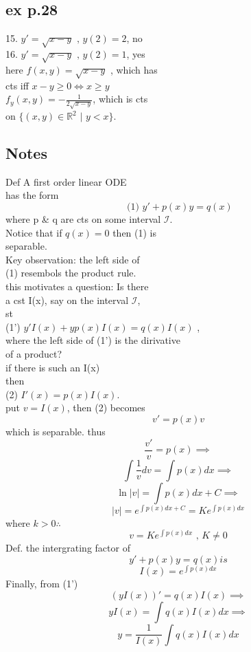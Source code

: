 \documentclass[10pt,a4paper]{article}
\begin{document}
  \newpage 
{}
  \subsection*{ ex p.28 }
  15. \( y' = \sqrt{x-y} \text{ ,  } y(2) = 2 \),  no \\
  16. \( y' = \sqrt{x-y} \text{ ,  } y(2) = 1 \),  yes \\
  here \( f(x, y) = \sqrt{x-y}\) , which has \\
  cts iff  \( x-y \geq 0 \iff x \geq y\) \\ 
  \( f_y(x, y) = - \frac{1}{2\sqrt{x-y}}\),  which is cts \\
  on \( \{ (x,y) \in \mathbb{R}^2 \text{ | } y<x \}\). \\
  \subsection*{ Notes \\ } 
  Def A first order linear ODE \\
  has the form
  \[ \text{ (1) } y' + p(x)y = q(x)\] 
  where p \& q are cts on some interval \( \mathcal{I}\). \\
  Notice that if \( q(x) = 0\) then (1) is \\	
  separable. \\	  
  Key observation: the left side of \\
  (1) resembols the product rule. \\
  this motivates a question: Is there \\
  a cst I(x), say on the interval \( \mathcal{I}\),  \\
  st  \\
  (1') \( y'I(x) + yp(x)I(x) = q(x)I(x)\) ,  \\
  where the left side of (1') is the dirivative  \\
  of a product? \\

  if there is such an I(x)  \\
  then  \\
  (2) \( I'(x) = p(x)I(x)\). \\
  put \( v = I(x)\), then (2) becomes  \\
  \[ v' = p(x)v\]
  which is separable. thus \nonumber\\
  \[ \frac{v'}{v} = p(x) \implies\]
  \[ \int \frac{1}{v}dv = \int p(x)dx \implies\]
  \[ \ln|v| = \int p(x)dx + C \implies \]
  \[ |v| = e^{\int p(x)dx + C} = Ke^{\int p(x)dx}\]
  where \( k > 0 \therefore\)
  \[ v = Ke^{\int p(x)dx} \text{ , } K \neq  0\]
  Def. the intergrating factor of 
  \[ y' + p(x)y = q(x) is \]
  \[ I(x) = e^{\int p(x) dx }\]
  Finally, from (1') 
  \[ (yI(x))' = q(x)I(x) \implies \]
  \[ yI(x) = \int q(x)I(x)dx \implies\] 
  \[ \boxed{ y = \frac{1}{I(x)} \int q(x)I(x)dx}\]
 
\end{document}

